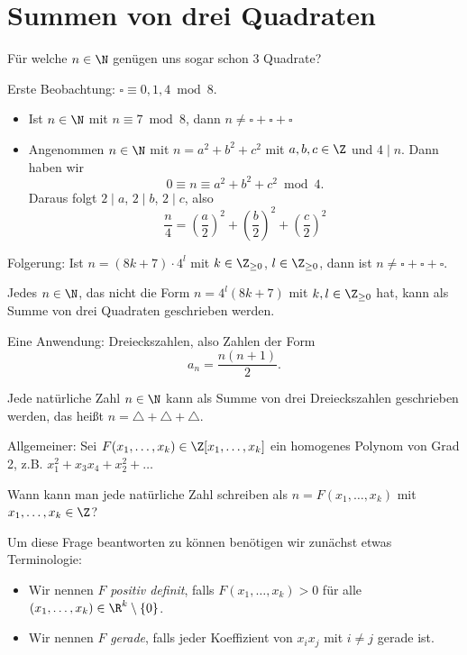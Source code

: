 \section{Summen von drei Quadraten}

\begin{frage*}
	Für welche $n \in \N$ genügen uns sogar schon 3 Quadrate?
\end{frage*}

Erste Beobachtung: $\square \equiv 0,1,4 \bmod 8$.
\begin{itemize}
	\item Ist $n \in \N$ mit $n \equiv 7 \bmod 8$, dann $n \neq \square + \square + \square$
	\item Angenommen $n \in \N$ mit $n = a^2+b^2+c^2$ mit $a,b,c \in \Z$ und $4 \mid n$. Dann haben wir
	\[ 0 \equiv n \equiv a^2+b^2+c^2 \bmod 4. \]
	Daraus folgt $2 \mid a$, $2\mid b$, $2 \mid c$, also
	\[ \frac{n}{4} = \left(\frac{a}{2}\right)^2 + \left(\frac{b}{2}\right)^2 + \left(\frac{c}{2}\right)^2 \]
\end{itemize}
Folgerung: Ist $n = (8k+7) \cdot 4^l$ mit $k \in \Z_{\geq 0}$, $l \in \Z_{\geq 0}$, dann ist $n \neq \square + \square + \square$.\pagebreak

\begin{thm}\autolabel
	Jedes $n \in \N$, das nicht die Form $n = 4^l(8k+7)$ mit $k,l \in \Z_{\geq 0}$ hat, kann als Summe von drei Quadraten geschrieben werden.
\end{thm}

Eine Anwendung: Dreieckszahlen, also Zahlen der Form
\[ a_n = \frac{n(n+1)}{2}. \]

\begin{cor}\autolabel
	Jede natürliche Zahl $n \in \N$ kann als Summe von drei Dreieckszahlen geschrieben werden, das heißt $n = \triangle + \triangle + \triangle $.
\end{cor}

Allgemeiner: Sei $F(x_1,\dotsc,x_k) \in \Z[x_1,\dotsc,x_k]$ ein homogenes Polynom von Grad 2, z.B. $x_1^2 + x_3x_4 + x_2^2 + \dots$

\begin{frage*}
	Wann kann man jede natürliche Zahl schreiben als $n = F(x_1,\dotsc,x_k)$ mit $x_1,\dotsc,x_k \in \Z$?
\end{frage*}

Um diese Frage beantworten zu können benötigen wir zunächst etwas Terminologie:
\begin{itemize}
	\item Wir nennen $F$ \emph{positiv definit}, falls $F(x_1,\dotsc,x_k) > 0$ für alle \( (x_1,\dotsc,x_k) \in \R^k \setminus \{0\} \).
	\item Wir nennen $F$ \emph{gerade}, falls jeder Koeffizient von $x_ix_j$ mit $i \neq j$ gerade ist.
\end{itemize}

